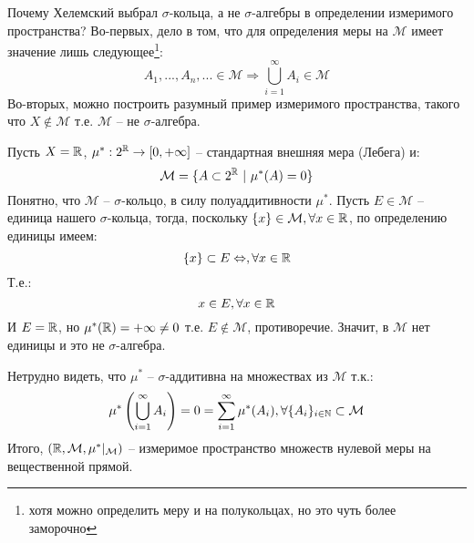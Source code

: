 \documentclass[../main.tex]{subfiles}
\begin{document}
Почему Хелемский выбрал $\sigma$-кольца, а не $\sigma$-алгебры в определении измеримого пространства? Во-первых, дело в том, что для определения меры на $\mathcal{M}$ имеет значение лишь следующее\footnote{хотя можно определить меру и на полукольцах, но это чуть более заморочно}:
\begin{equation*}
	A_1, ..., A_n, ... \in \mathcal{M} \Rightarrow \bigcup_{i=1}^{\infty}{A_i} \in \mathcal{M}
\end{equation*}
Во-вторых, можно построить разумный пример измеримого пространства, такого что $X \notin \mathcal{M}$ т.е. $\mathcal{M}$ -- не $\sigma$-алгебра.

\begin{example}
	Пусть $X = \mathbb{R}$, $\mu^* : 2^{\mathbb{R}} \to [0, +\infty]$ -- стандартная внешняя мера (Лебега) и:
	$$\mathcal{M} = \{A \subset 2^{\mathbb{R}} \ | \ \mu^* (A) = 0\}$$
	Понятно, что $\mathcal{M}$ -- $\sigma$-кольцо, в силу полуаддитивности $\mu^*$. Пусть $E \in \mathcal{M}$ -- единица нашего $\sigma$-кольца, тогда, поскольку $\{x\} \in \mathcal{M}, \forall x \in \mathbb{R}$, по определению единицы имеем:
	$$\{x\} \subset E \Leftrightarrow, \forall x \in \mathbb{R}$$
	Т.е.:
	$$x \in E, \forall x \in \mathbb{R}$$
	И $E = \mathbb{R}$, но $\mu^* (\mathbb{R}) = +\infty \neq 0$ т.е. $E \notin \mathcal{M}$, противоречие. Значит, в $\mathcal{M}$ нет единицы и это не $\sigma$-алгебра.
	
	Нетрудно видеть, что $\mu^*$ -- $\sigma$-аддитивна на множествах из $\mathcal{M}$ т.к.:
	\begin{equation*}
		\mu^* \left(\bigcup_{i=1}^{\infty}{A_i}\right) = 0 = \sum_{i=1}^{\infty}{\mu^* (A_i)}, \forall \{A_i\}_{i \in \mathbb{N}} \subset \mathcal{M}
	\end{equation*}
	Итого, $(\mathbb{R}, \mathcal{M}, \mu^* |_{\mathcal{M}})$ -- измеримое пространство множеств нулевой меры на вещественной прямой. 
\end{example}
\end{document}

